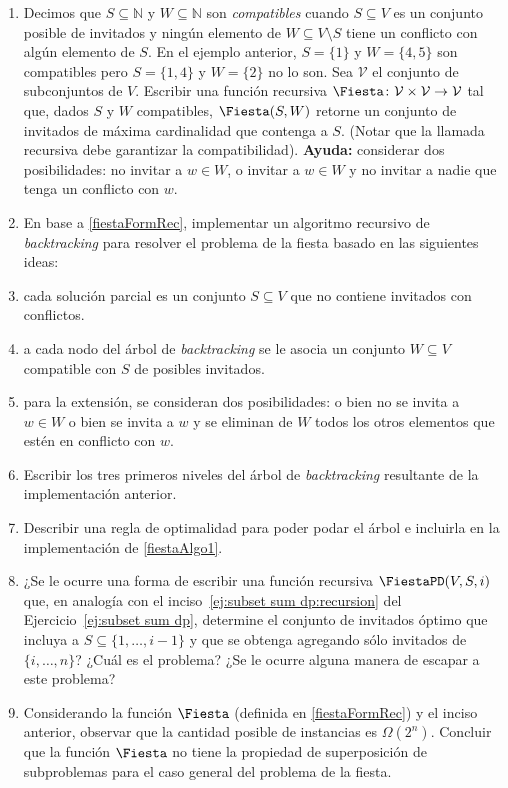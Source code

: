  \begin{enumerate}[label=$\alph*)$,ref=$\alph*)$]
  \item Decimos que $S \subseteq \mathbb{N}$ y $W \subseteq \mathbb{N}$ son \emph{compatibles} cuando $S \subseteq V$ es un conjunto posible de invitados y ningún elemento de $W \subseteq V \setminus S$ tiene un conflicto con algún elemento de $S$.  En el ejemplo anterior, $S = \{1\}$ y $W = \{4, 5\}$ son compatibles pero $S = \{1,4\}$ y $W = \{2\}$ no lo son.  Sea $\mathcal{V}$ el conjunto de subconjuntos de $V$.  Escribir una función recursiva $\Fiesta \colon \mathcal{V} \times \mathcal{V} \to \mathcal{V}$ tal que, dados $S$ y $W$ compatibles, $\Fiesta(S, W)$ retorne un conjunto de invitados de máxima cardinalidad que contenga a $S$.  (Notar que la llamada recursiva debe garantizar la compatibilidad).  \textbf{Ayuda:} considerar dos posibilidades: no invitar a $w \in W$, o invitar a $w \in W$ y no invitar a nadie que tenga un conflicto con $w$.
  \label{fiestaFormRec}

  \item En base a \ref{fiestaFormRec}, implementar un algoritmo recursivo de \emph{backtracking} para resolver el problema de la fiesta basado en las siguientes ideas:
   \item cada solución parcial es un conjunto $S \subseteq V$ que no contiene invitados con conflictos.
   \item a cada nodo del árbol de \textit{backtracking} se le asocia un conjunto $W \subseteq V$ compatible con $S$ de posibles invitados.
   \item para la extensión, se consideran dos posibilidades: o bien no se invita a $w \in W$ o bien se invita a $w$ y se eliminan de $W$ todos los otros elementos que estén en conflicto con $w$.
  \label{fiestaAlgo1}
  \item Escribir los tres primeros niveles del árbol de \textit{backtracking} resultante de la implementación anterior.
  \item Describir una regla de optimalidad para poder podar el árbol e incluirla en la implementación de \ref{fiestaAlgo1}.
  \item\label{ej:ind set:dp} ¿Se le ocurre una forma de escribir una función recursiva $\FiestaPD(V, S, i)$ que, en analogía con el inciso~\ref{ej:subset sum dp:recursion} del Ejercicio~\ref{ej:subset sum dp}, determine el conjunto de invitados óptimo que incluya a $S \subseteq \{1, \ldots, i-1\}$ y que se obtenga agregando sólo invitados de $\{i, \ldots, n\}$? ¿Cuál es el problema?  ¿Se le ocurre alguna manera de escapar a este problema?
  \item Considerando la función $\Fiesta$ (definida en \ref{fiestaFormRec}) y el inciso anterior, observar que la cantidad posible de instancias es $\Omega(2^n)$.  Concluir que la función $\Fiesta$ no tiene la propiedad de superposición de subproblemas para el caso general del problema de la fiesta.
 \end{enumerate}


